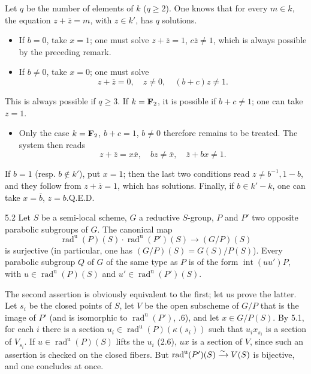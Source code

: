 Let $q$ be the number of elements of $k$ ($q\geq2$). One knows that for every $m\in k$, the equation $z+\overline z=m$, with $z\in k'$, has $q$ solutions.
\begin{itemize}
\item If $b=0$, take $x=1$; one must solve $z+\overline z=1$, $c\overline z\neq1$, which is always possible by the preceding remark.
\item If $b\neq0$, take $x=0$; one must solve
\[
 z+\overline z=0,\quad z\neq0,\quad (b+c)z\neq1.
\]
\end{itemize}
This is always possible if $q\geq3$. If $k=\mathbf{F}_2$, it is possible if $b+c\neq1$; one can take $z=1$.
\begin{itemize}
\item Only the case $k=\mathbf{F}_2$, $b+c=1$, $b\neq0$ therefore remains to be treated. The system then reads
\[
 z+\overline z=x\overline x,\quad bz\neq\overline x,\quad\overline z+bx\neq1.
\]
\end{itemize}
If $b=1$ (resp. $b\notin k'$), put $x=1$; then the last two conditions read $z\neq b^{-1},1-b$, and they follow from $z+\overline z=1$, which has solutions. Finally, if $b\in k'-k$, one can take $x=\overline b$, $z=b$.\hfill Q.E.D.

\begin{corollary}{5.2}\label{XXVI.5.2}
Let $S$ be a semi-local scheme, $G$ a reductive $S$-group, $P$ and $P'$ two opposite parabolic subgroups of $G$. The canonical map
\[
 \operatorname{rad}^{\mathrm u}(P)(S)\cdot\operatorname{rad}^{\mathrm u}(P')(S)\to(G/P)(S)
\]
is surjective (in particular, one has $(G/P)(S)=G(S)/P(S)$). Every parabolic subgroup $Q$ of $G$ of the same type as $P$ is of the form $\operatorname{int}(uu')P$, with $u\in\operatorname{rad}^{\mathrm u}(P)(S)$ and $u'\in\operatorname{rad}^{\mathrm u}(P')(S)$.
\end{corollary}
The second assertion is obviously equivalent to the first; let us prove the latter. Let $s_i$ be the closed points of $S$, let $V$ be the open subscheme of $G/P$ that is the image of $P'$ (and is isomorphic to $\operatorname{rad}^{\mathrm u}(P')$, .6), and let $x\in G/P(S)$. By 5.1, for each $i$ there is a section $u_i\in\operatorname{rad}^{\mathrm u}(P)(\kappa(s_i))$ such that $u_ix_{s_i}$ is a section of $V_{s_i}$. If $u\in\operatorname{rad}^{\mathrm u}(P)(S)$ lifts the $u_i$ (2.6), $ux$ is a section of $V$, since such an assertion is checked on the closed fibers. But $\operatorname{rad}^{\mathrm u}(P')(S)\xrightarrow{\sim} V(S)$ is bijective, and one concludes at once.

